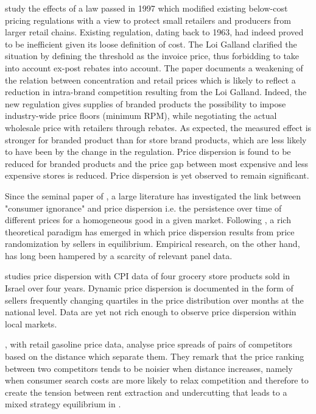 \documentclass[english]{article}
\begin{document}
\cite{BIS13} study the effects of a law passed in 1997 which modified existing below-cost pricing regulations with a view to protect small retailers and producers from larger retail chains. Existing regulation, dating back to 1963, had indeed proved to be inefficient given its loose definition of cost. The Loi Galland clarified the situation by defining the threshold as the invoice price, thus forbidding to take into account ex-post rebates into account. The paper documents a weakening of the relation between concentration and retail prices which is likely to reflect a reduction in intra-brand competition resulting from the Loi Galland. Indeed, the new regulation gives supplies of branded products the possibility to impose industry-wide price floors (minimum RPM), while negotiating the actual wholesale price with retailers through rebates. As expected, the measured effect is stronger for branded product than for store brand products, which are less likely to have been by the change in the regulation. Price dispersion is found to be reduced for branded products and the price gap between most expensive and less expensive stores is reduced. Price dispersion is yet observed to remain significant.

Since the seminal paper of \cite{STI61}, a large literature has investigated the link between "consumer ignorance" and price dispersion i.e. the persistence over time of different prices for a homogeneous good in a given market. Following \cite{VAR80}, a rich theoretical paradigm has emerged in which price dispersion results from price randomization by sellers in equilibrium. Empirical research, on the other hand, has long been hampered by a scarcity of relevant panel data.

\cite{LAC02} studies price dispersion with CPI data of four grocery store products sold in Israel over four years. Dynamic price dispersion is documented in the form of sellers frequently changing quartiles in the price distribution over months at the national level. Data are yet not rich enough to observe price dispersion within local markets.

\cite{TAP11}, with retail gasoline price data, analyse price spreads of pairs of competitors based on the distance which separate them. They remark that the price ranking between two competitors tends to be noisier when distance increases, namely when consumer search costs are more likely to relax competition and therefore to create the tension between rent extraction and undercutting that leads to a mixed strategy equilibrium in \cite{VAR80}.
\end{document}
